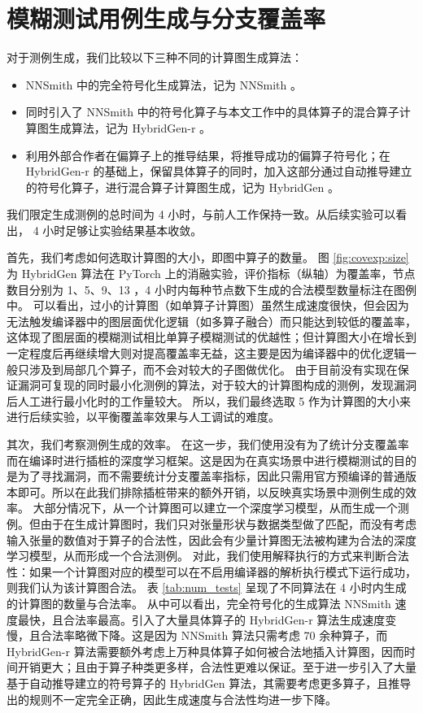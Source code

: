 \section{模糊测试用例生成与分支覆盖率}
\label{sec:exp_gen}

对于测例生成，我们比较以下三种不同的计算图生成算法：
\begin{itemize}
    \item NNSmith 中的完全符号化生成算法，记为 NNSmith 。
    \item 同时引入了 NNSmith 中的符号化算子与本文工作中的具体算子的混合算子计算图生成算法，记为 HybridGen-r 。
    \item 利用外部合作者在偏算子上的推导结果，将推导成功的偏算子符号化；在 HybridGen-r 的基础上，保留具体算子的同时，加入这部分通过自动推导建立的符号化算子，进行混合算子计算图生成，记为 HybridGen 。
\end{itemize}
我们限定生成测例的总时间为 4 小时，与前人工作\cite{nnsmith,tzer}保持一致。从后续实验可以看出， 4 小时足够让实验结果基本收敛。

首先，我们考虑如何选取计算图的大小，即图中算子的数量。
图 \ref{fig:covexp:size} 为 HybridGen 算法在 PyTorch 上的消融实验，评价指标（纵轴）为覆盖率，节点数目分别为 1、5、9、13 ，4 小时内每种节点数下生成的合法模型数量标注在图例中。
可以看出，过小的计算图（如单算子计算图）虽然生成速度很快，但会因为无法触发编译器中的图层面优化逻辑（如多算子融合）而只能达到较低的覆盖率，这体现了图层面的模糊测试相比单算子模糊测试的优越性；但计算图大小在增长到一定程度后再继续增大则对提高覆盖率无益，这主要是因为编译器中的优化逻辑一般只涉及到局部几个算子，而不会对较大的子图做优化。
由于目前没有实现在保证漏洞可复现的同时最小化测例的算法，对于较大的计算图构成的测例，发现漏洞后人工进行最小化时的工作量较大。
所以，我们最终选取 5 作为计算图的大小来进行后续实验，以平衡覆盖率效果与人工调试的难度。

其次，我们考察测例生成的效率。
在这一步，我们使用没有为了统计分支覆盖率而在编译时进行插桩的深度学习框架。这是因为在真实场景中进行模糊测试的目的是为了寻找漏洞，而不需要统计分支覆盖率指标，因此只需用官方预编译的普通版本即可。所以在此我们排除插桩带来的额外开销，以反映真实场景中测例生成的效率。
大部分情况下，从一个计算图可以建立一个深度学习模型，从而生成一个测例。但由于在生成计算图时，我们只对张量形状与数据类型做了匹配，而没有考虑输入张量的数值对于算子的合法性，因此会有少量计算图无法被构建为合法的深度学习模型，从而形成一个合法测例。
对此，我们使用解释执行的方式来判断合法性：如果一个计算图对应的模型可以在不启用编译器的解析执行模式下运行成功，则我们认为该计算图合法。
表 \ref{tab:num_tests} 呈现了不同算法在 4 小时内生成的计算图的数量与合法率。
从中可以看出，完全符号化的生成算法 NNSmith 速度最快，且合法率最高。引入了大量具体算子的 HybridGen-r 算法生成速度变慢，且合法率略微下降。这是因为 NNSmith 算法只需考虑 70 余种算子，而 HybridGen-r 算法需要额外考虑上万种具体算子如何被合法地插入计算图，因而时间开销更大；且由于算子种类更多样，合法性更难以保证。至于进一步引入了大量基于自动推导建立的符号算子的 HybridGen 算法，其需要考虑更多算子，且推导出的规则不一定完全正确，因此生成速度与合法性均进一步下降。

